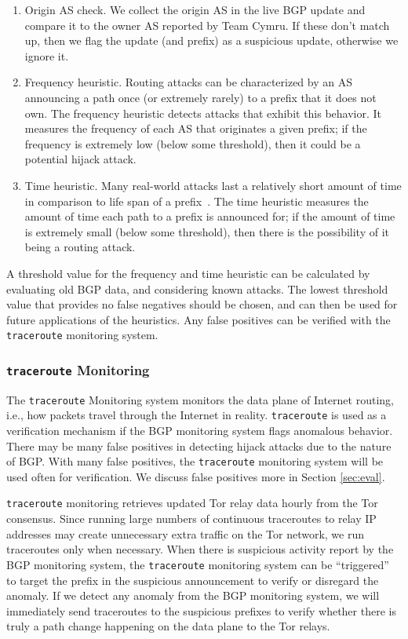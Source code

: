 \begin{enumerate}
\item Origin AS check.  We collect the origin AS in the live BGP update and compare it to the owner AS reported by Team Cymru.  If these don't match up, then we flag the update (and prefix) as a suspicious update, otherwise we ignore it. 
\item Frequency heuristic.  Routing attacks can be 
characterized by an AS announcing a path once (or extremely rarely) to a prefix 
that it does not own.  The frequency heuristic detects attacks that exhibit this behavior. 
It measures the frequency of each AS that originates a given prefix; if the frequency is 
extremely low (below some threshold), then it could be a potential hijack attack.
\item Time heuristic.  Many real-world attacks 
last a relatively short amount of time in comparison to life span of a prefix~\cite{indiahijack, syriahijack,indosat2014, malaysialeak}. The time heuristic measures the amount of time each 
path to a prefix is announced for; if the amount of time is extremely small (below some threshold), 
then there is the possibility of it being a routing attack. 
\end{enumerate}  

A threshold value for the frequency and time heuristic can be calculated by evaluating old BGP data, and considering known attacks.  The lowest threshold value that provides no false negatives should be chosen, and can then be used for future applications of the heuristics.  Any false positives can be verified with the {\tt traceroute} monitoring system.

\subsubsection{{\tt traceroute} Monitoring} 
The {\tt traceroute} Monitoring system monitors the data plane of Internet routing, i.e., how packets travel through the Internet in reality. {\tt traceroute} is used as a verification mechanism if the BGP monitoring system flags anomalous behavior. There may be many false positives in detecting hijack attacks due to the nature of BGP.  With many false positives, the {\tt traceroute} monitoring system will be used often for verification.  We discuss false positives more in Section \ref{sec:eval}.

{\tt traceroute} monitoring retrieves updated Tor relay data hourly from the Tor consensus. Since running large numbers of continuous traceroutes to relay IP addresses may create unnecessary extra traffic on the Tor network, we run traceroutes only when necessary.  When there is suspicious activity report by the BGP monitoring system, the {\tt traceroute} monitoring system can be ``triggered'' to target the prefix in the suspicious announcement to verify or disregard the anomaly. If we detect any anomaly from the BGP monitoring system, we will immediately send traceroutes to the suspicious prefixes to verify whether there is truly a path change happening on the data plane to the Tor relays. 

